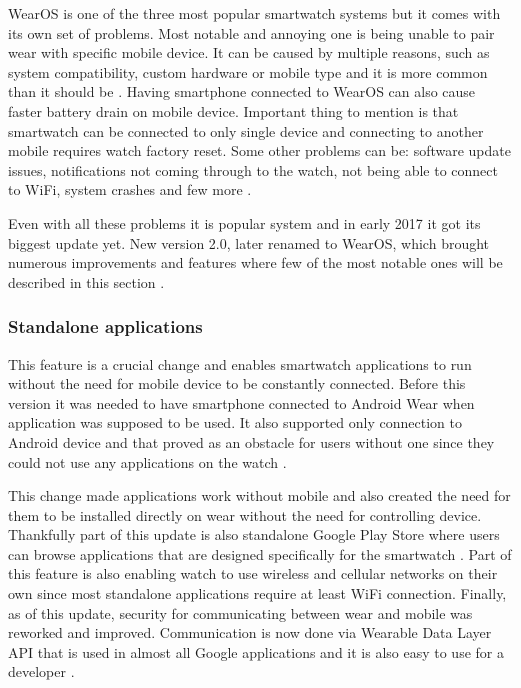 WearOS is one of the three most popular smartwatch systems but it comes with its own set of problems. Most notable and annoying one is being unable to pair wear with specific mobile device. It can be caused by multiple reasons, such as system compatibility, custom hardware or mobile type and it is more common than it should be \cite{AWPaS}. Having smartphone connected to WearOS can also cause faster battery drain on mobile device. Important thing to mention is that smartwatch can be connected to only single device and connecting to another mobile requires watch factory reset. Some other problems can be: software update issues, notifications not coming through to the watch, not being able to connect to WiFi, system crashes and few more \cite{WAWP}.

Even with all these problems it is popular system and in early 2017 it got its biggest update yet. New version 2.0, later renamed to WearOS, which brought numerous improvements and features where few of the most notable ones will be described in this section \cite{AW2UG, AW2WN, AW2N}.

\subsubsection{Standalone applications}\label{sec:StandaloneApplications}
This feature is a crucial change and enables smartwatch applications to run without the need for mobile device to be constantly connected. Before this version it was needed to have smartphone connected to Android Wear when application was supposed to be used. It also supported only connection to Android device and that proved as an obstacle for users without one since they could not use any applications on the watch \cite{AW2UG, AW2WN}.

This change made applications work without mobile and also created the need for them to be installed directly on wear without the need for controlling device. Thankfully part of this update is also standalone Google Play Store where users can browse applications that are designed specifically for the smartwatch \cite{AW2WN}. Part of this feature is also enabling watch to use wireless and cellular networks on their own since most standalone applications require at least WiFi connection. Finally, as of this update, security for communicating between wear and mobile was reworked and improved. Communication is now done via Wearable Data Layer API that is used in almost all Google applications and it is also easy to use for a developer \cite{AW2UG}. 

